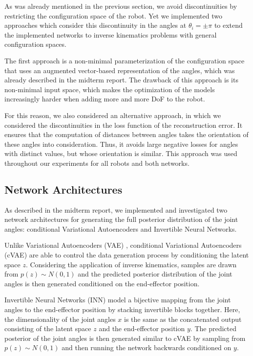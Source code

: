 \documentclass[conference]{IEEEtran}
\begin{document}
As was already mentioned in the previous section, we avoid discontinuities by restricting the configuration space of the robot. Yet we implemented two approaches which consider this discontinuity in the angles at $\theta_i = \pm \pi$ to extend the implemented networks to inverse kinematics problems with general configuration spaces.

The first approach is a non-minimal parameterization of the configuration space that uses an augmented vector-based representation of the angles, which was already described in the midterm report. The drawback of this approach is its non-minimal input space, which makes the optimization of the models increasingly harder when adding more and more DoF to the robot.

For this reason, we also considered an alternative approach, in which we considered the discontinuities in the loss function of the reconstruction error. It ensures that the computation of distances between angles takes the orientation of these angles into consideration. Thus, it avoids large negative losses for angles with distinct values, but whose orientation is similar. This approach was used throughout our experiments for all robots and both networks.

\subsection*{Network Architectures}

As described in the midterm report, we implemented and investigated two network architectures for generating the full posterior distribution of the joint angles: conditional Variational Autoencoders and Invertible Neural Networks. 

Unlike Variational Autoencoders (VAE) \cite{Kingma2014}, conditional Variational Autoencoders (cVAE) \cite{Sohn2015} are able to control the data generation process by conditioning the latent space $z$. Considering the application of inverse kinematics, samples are drawn from $p(z) \sim N(0, 1)$ and the predicted posterior distribution of the joint angles is then generated conditioned on the end-effector position.

Invertible Neural Networks (INN) \cite{Ardizzone2018} model a bijective mapping from the joint angles to the end-effector position by stacking invertible blocks together. Here, the dimensionality of the joint angles $x$ is the same as the concatenated output consisting of the latent space $z$ and the end-effector position $y$. The predicted posterior of the joint angles is then generated similar to cVAE by sampling from $p(z) \sim N(0, 1)$ and then running the network backwards conditioned on $y$.
\end{document}
